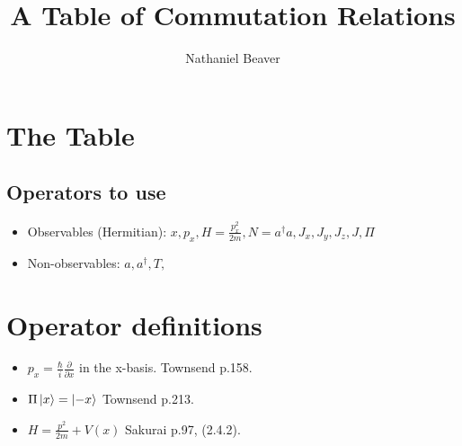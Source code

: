 \documentclass[12pt,letterpaper]{article}
\author{Nathaniel Beaver}
\title{A Table of Commutation Relations}
\begin{document}
\maketitle

\section{The Table}

\subsection{Operators to use}

\begin{itemize}
\item Observables (Hermitian): $x, p_x, H=\frac{p_x^2}{2m}, N=a^\dagger a, J_x, J_y, J_z, J, \hyperref[def_Pi]{\Pi}$
\item Non-observables: $a, a^\dagger, T, $
\end{itemize}


\renewcommand{\dtldisplayafterhead}{\hline} %
\renewcommand{\dtlstringalign}{c} %



\newpage

\section{Operator definitions}
\begin{itemize}
\item \label{def_p_x} $p_x = \frac{\hbar}{i}\frac{\partial}{\partial x}$ in the x-basis. Townsend p.158.
\item \label{def_Pi} $\Pi\ket{x}=\ket{-x}$ Townsend p.213.
\item \label{def_H} $H = \frac{p^2}{2m} + V(x)$ Sakurai p.97, (2.4.2). 
\end{itemize}
\end{document}
